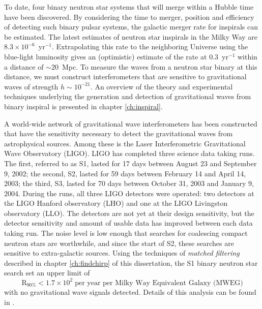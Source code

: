 To date, four binary neutron star systems that will merge within a Hubble time
have been discovered.   By considering the time to merger, position and
efficiency of detecting such binary pulsar systems, the galactic merger rate
for inspirals can be estimated\cite{Phinney:1991ei}.  The latest estimates of
neutron star inspirals in the Milky Way are $8.3 \times 10^{-6}$~yr$^{-1}$. 
Extrapolating this rate to the neighboring Universe using the
blue-light luminosity gives an (optimistic) estimate of the rate at
$0.3$~yr$^{-1}$ within a distance of $\sim 20$~Mpc.  To measure the waves from
a neutron star binary at this distance,  we must construct
interferometers that are sensitive to gravitational waves of strength $h \sim
10^{-21}$. An overview of the theory and experimental techniques underlying
the generation and detection of gravitational waves from binary inspiral is
presented in chapter \ref{ch:inspiral}.

A world-wide network of gravitational wave interferometers has been
constructed that have the sensitivity necessary to detect the gravitational
waves from astrophysical sources. Among these is the Laser Interferometric
Gravitational Wave Observatory (LIGO)\cite{Barish:1999}. LIGO has completed
three science data taking runs. The first, referred to as S1, lasted for 17
days between August 23 and September 9, 2002; the second, S2, lasted for 59
days between February 14 and April 14, 2003; the third, S3, lasted for 70 days
between October 31, 2003 and January 9, 2004.  During the runs, all three LIGO
detectors were operated: two detectors at the LIGO Hanford observatory (LHO)
and one at the LIGO Livingston observatory (LLO).  The detectors are not yet
at their design sensitivity, but the detector sensitivity and amount of
usable data has improved between each data taking run. The noise level is low
enough that searches for coalescing compact neutron stars are worthwhile, and
since the start of S2, these searches are sensitive to extra-galactic sources.
Using the techniques of \emph{matched filtering} described in chapter
\ref{ch:findchirp} of this dissertation, the S1 binary neutron star search set
an upper limit of
\begin{equation}
\mathrm{R}_{90\%} < 1.7 \times 10^2 \;\textrm{per year per Milky Way Equivalent Galaxy (MWEG)}
\end{equation}
with no gravitational wave signals detected. Details of this analysis can be
found in \cite{LIGOS1iul}. 

